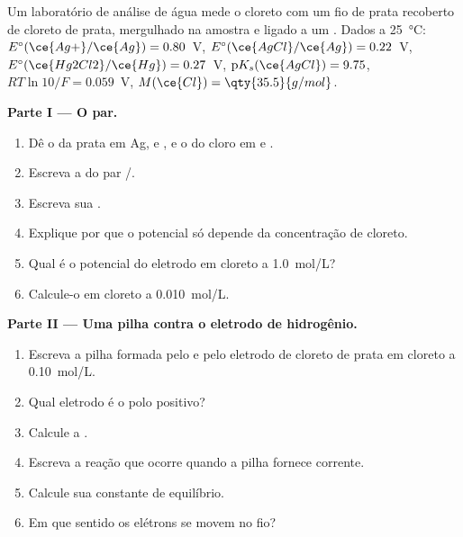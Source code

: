 \begin{problem}
\label{pb:b1:nernst:1}
Um laboratório de análise de água mede o cloreto com um fio de prata
recoberto de cloreto de prata, mergulhado na amostra e ligado a um
. Dados a \qty{25}{\celsius}:
$E^\circ(\ce{Ag+}/\ce{Ag}) = 0.80$~V,
$E^\circ(\ce{AgCl}/\ce{Ag}) = 0.22$~V, $E^\circ(\ce{Hg2Cl2}/\ce{Hg}) =
0.27$~V, $\mathrm{p}K_s(\ce{AgCl}) = 9.75$, $RT\ln 10/F = 0.059$~V,
$M(\ce{Cl}) = \qty{35.5}{g/mol}$.

\medskip
\noindent\textbf{Parte I --- O par.}
\begin{enumerate}
  \item Dê o  da prata em Ag,  e , e o
        do cloro em  e .
  \item Escreva a  do par /.
  \item Escreva sua .
  \item Explique por que o potencial só depende da concentração de
        cloreto.
  \item Qual é o potencial do eletrodo em cloreto a \qty{1.0}{mol/L}?
  \item Calcule-o em cloreto a \qty{0.010}{mol/L}.
\end{enumerate}

\medskip
\noindent\textbf{Parte II --- Uma pilha contra o eletrodo de hidrogênio.}
\begin{enumerate}[resume]
  \item Escreva a pilha formada pelo  e pelo
        eletrodo de cloreto de prata em cloreto a \qty{0.10}{mol/L}.
  \item Qual eletrodo é o polo positivo?
  \item Calcule a .
  \item Escreva a reação que ocorre quando a pilha fornece corrente.
  \item Calcule sua constante de equilíbrio.
  \item Em que sentido os elétrons se movem no fio?
\end{enumerate}


\end{problem}

